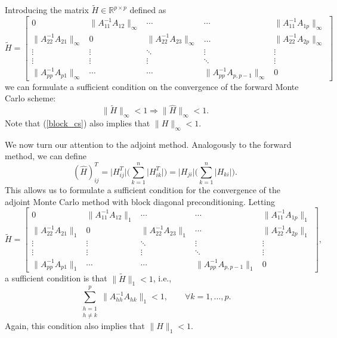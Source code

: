 \documentclass[final,leqno,onefignum,onetabnum]{siamltex1213}
\begin{document}
Introducing the matrix $\tilde{H}\in \mathbb{R}^{p\times p}$ defined as
\[
 \tilde{H}=\begin{bmatrix}0 & \lVert A_{11}^{-1}A_{12}\rVert_{\infty} &
\cdots &
\cdots & \lVert A_{11}^{-1}A_{1p}\rVert_{\infty} \\
\lVert A_{22}^{-1}A_{21}\rVert_{\infty} & 0 & \lVert
A_{22}^{-1}A_{23}\rVert_{\infty} &
\dots & \lVert A_{22}^{-1}A_{2p}\rVert_{\infty} \\
\vdots & \vdots & \ddots & \vdots & \vdots\\
\vdots & \vdots & \vdots &\ddots & \vdots \\
\lVert A_{pp}^{-1}A_{p1}\rVert_{\infty} &  \cdots & \cdots&
\lVert A_{pp}^{-1}A_{p,p-1}\rVert_{\infty} & 0
\end{bmatrix}
\]
we can formulate a
sufficient condition on the convergence of the forward Monte
Carlo scheme:
\begin{equation}
 \lVert \tilde{H} \rVert_{\infty}<1 \Rightarrow \lVert \hat{H}
\rVert_{\infty}<1.
\end{equation}
Note that (\ref{block_cs}) also implies that $\|H\|_{\infty} < 1$.

We now turn our attention to the adjoint method.
Analogously to the forward method, we can define
\[
(\hat{H})^T_{ij} = \lvert H^T_{ij}\rvert\bigg(\sum_{k=1}^n\lvert
H^T_{ik}\rvert\bigg) = \lvert H_{ji}\rvert\bigg(\sum_{k=1}^n\lvert
H_{ki}\rvert\bigg).
\]
This allows us to formulate a sufficient condition for the convergence of
the adjoint Monte Carlo method with block diagonal preconditioning.
Letting
\[
  \tilde{H}=\begin{bmatrix}0 & \lVert A_{11}^{-1}A_{12}\rVert_{1} & \cdots
&
\cdots & \lVert A_{11}^{-1}A_{1p}\rVert_{1} \\
\lVert A_{22}^{-1}A_{21}\rVert_{1} & 0 & \lVert
A_{22}^{-1}A_{23}\rVert_{1} &
\cdots & \lVert A_{22}^{-1}A_{2p}\rVert_{1} \\
\vdots & \vdots & \ddots & \vdots & \vdots\\
\vdots & \vdots & \vdots &\ddots & \vdots \\
\lVert A_{pp}^{-1}A_{p1}\rVert_{1} &  \cdots & \cdots&
\lVert A_{pp}^{-1}A_{p,p-1}\rVert_{1} & 0
\end{bmatrix},
\]
a sufficient condition is that $\lVert \tilde{H} \rVert_{1}<1$, i.e.,
 \begin{equation}
  \sum_{\substack{h=1\\h\ne k}}^p \lVert A_{hh}^{-1}A_{hk}\rVert_1<1,
    \label{block_cs_2}\qquad \forall k=1,\ldots,p.
 \end{equation}
Again, this condition also implies that $\|H\|_1 < 1$.
\end{document}
